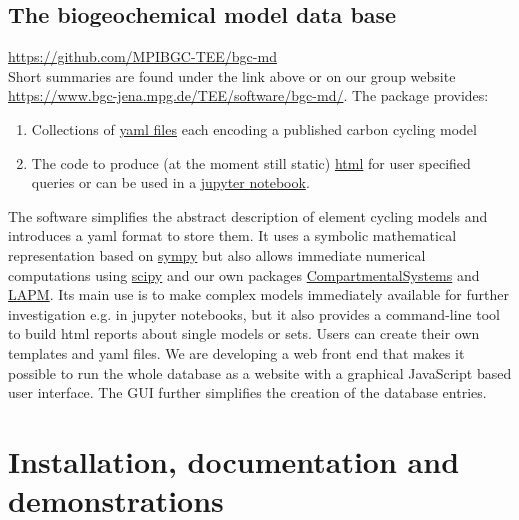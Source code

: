 \documentclass[a4paper]{article}
\begin{document}
\subsection{The biogeochemical model data base}
\url{https://github.com/MPIBGC-TEE/bgc-md}\\
Short summaries are found under the link above or on our group website \url{https://www.bgc-jena.mpg.de/TEE/software/bgc-md/}.
The package provides: 
\begin{enumerate} 
	\item
	Collections of \href{https://github.com/MPIBGC-TEE/bgc-md/tree/master/bgc_md/data/all_records}{yaml files} each encoding a published carbon cycling model  
	
	\item 
		The code to produce (at the moment still static) \href{https://www.bgc-jena.mpg.de/TEE/software/bgc-md/vegetation/list_report_v.html}{html} for user specified queries or can be used in a \href{https://github.com/MPIBGC-TEE/bgc-md/blob/master/jupyter_notebooks/Examples/how_to_apply_toolkit_to_yaml_model.ipynb}{jupyter notebook}. 
\end{enumerate} 
The software simplifies the abstract description of element cycling models and introduces a yaml format to store them. It uses a symbolic mathematical representation based on \href{http://www.sympy.org/en/index.htmlhttp://www.sympy.org/en/index.html}{sympy} but also allows immediate numerical computations using \href{https://scipy.org/}{scipy} and our own packages \href{https://github.com/MPIBGC-TEE/CompartmentalSystems}{CompartmentalSystems} and \href{https://github.com/MPIBGC-TEE/LAPM}{LAPM}. 
Its main use is to make complex models immediately available for further investigation e.g. in jupyter notebooks, but it also provides a command-line tool to build html reports about single models or sets. Users can create their own templates and yaml files.
We are developing a web front end that makes it possible to run the whole database as a website with a graphical JavaScript based user interface. The GUI further simplifies the creation of the database entries. 



\section{Installation, documentation and demonstrations}
\end{document}
